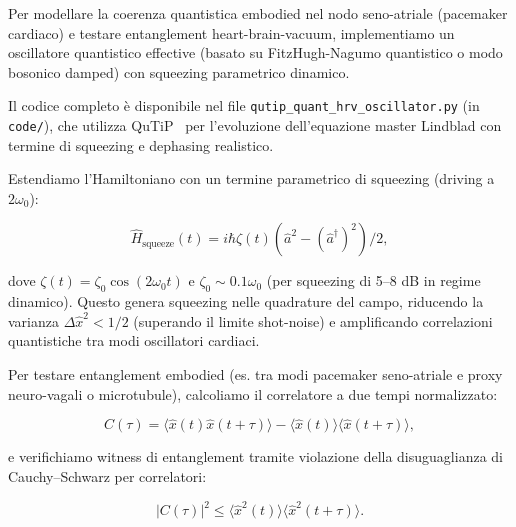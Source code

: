 \documentclass[11pt,a4paper]{article}
\let\oldcite\cite
\renewcommand{\cite}{\protect\oldcite}
\theoremstyle{plain}
\theoremstyle{definition}
\begin{document}
Per modellare la coerenza quantistica embodied nel nodo seno-atriale (pacemaker cardiaco) e testare entanglement heart-brain-vacuum, implementiamo un oscillatore quantistico effective (basato su FitzHugh-Nagumo quantistico o modo bosonico damped) con squeezing parametrico dinamico. 


\vspace{0.3cm}

Il codice completo è disponibile nel file \texttt{qutip\_quant\_hrv\_oscillator.py} (in \texttt{code/}), che utilizza QuTiP~\cite{Johansson2012qutip} per l'evoluzione dell'equazione master Lindblad con termine di squeezing e dephasing realistico.



\vspace{0.4cm}

Estendiamo l'Hamiltoniano con un termine parametrico di squeezing (driving a $2\omega_0$):

\begin{equation}
\hat{H}_{\text{squeeze}}(t) = i \hbar \zeta(t) \left( \hat{a}^2 - (\hat{a}^\dagger)^2 \right)/2,
\label{eq:H_squeeze}
\end{equation}

\vspace{0.2cm}

dove $\zeta(t) = \zeta_0 \cos(2 \omega_0 t)$ e $\zeta_0 \sim 0.1 \omega_0$ (per squeezing di 5--8 dB in regime dinamico). Questo genera squeezing nelle quadrature del campo, riducendo la varianza $\Delta \hat{x}^2 < 1/2$ (superando il limite shot-noise) e amplificando correlazioni quantistiche tra modi oscillatori cardiaci.


\vspace{0.4cm}

Per testare entanglement embodied (es. tra modi pacemaker seno-atriale e proxy neuro-vagali o microtubule), calcoliamo il correlatore a due tempi normalizzato:

\begin{equation}
C(\tau) = \langle \hat{x}(t) \hat{x}(t+\tau) \rangle - \langle \hat{x}(t) \rangle \langle \hat{x}(t+\tau) \rangle,
\label{eq:correlator}
\end{equation}

\vspace{0.2cm}

e verifichiamo witness di entanglement tramite violazione della disuguaglianza di Cauchy--Schwarz per correlatori:

\begin{equation}
|C(\tau)|^2 \leq \langle \hat{x}^2(t) \rangle \langle \hat{x}^2(t+\tau) \rangle.
\label{eq:CS_witness}
\end{equation}
\end{document}

